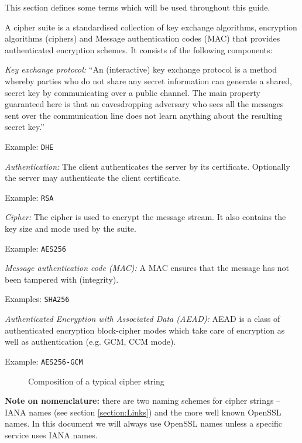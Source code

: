 
This section defines some terms which will be used throughout this guide.


A cipher suite is a standardised collection of key exchange algorithms, encryption 
algorithms (ciphers) and Message authentication codes (MAC) that provides authenticated 
encryption schemes. It consists of the following components:

\begin{description}

\item{\it Key exchange protocol:}
``An (interactive) key exchange protocol is a method whereby parties who do not 
share any secret information can generate a shared, secret key by communicating 
over a public channel. The main property guaranteed here is that an 
eavesdropping adversary who sees all the messages sent over the communication 
line does not learn anything about the resulting secret key.'' \cite{katz2008introduction}

Example: \texttt{DHE}

\item{\it Authentication:}
The client authenticates the server by its certificate. Optionally the server 
may authenticate the client certificate.

Example: \texttt{RSA}

\item{\it Cipher:}
The cipher is used to encrypt the message stream. It also contains the key size
and mode used by the suite.

Example: \texttt{AES256}

\item{\it Message authentication code (MAC):}
A MAC ensures that the message has not been tampered with (integrity).

Examples: \texttt{SHA256}

\item{\it Authenticated Encryption with Associated Data (AEAD):}
AEAD is a class of authenticated encryption block-cipher modes
which take care of encryption as well as authentication (e.g. GCM, CCM mode). 

Example: \texttt{AES256-GCM}



\begin{figure}[h]
\caption{Composition of a typical cipher string}
\end{figure}

\item {\textbf{Note on nomenclature:}} there are two naming schemes for cipher strings -- IANA names (see section \ref{section:Links}) and the more well known OpenSSL names. In this document we will always use OpenSSL names unless a specific service uses IANA names.

\end{description}
